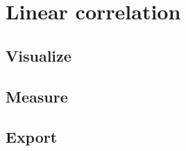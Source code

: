 %
%
%
\section{Linear correlation}


	\subsection{Visualize}

	\subsection{Measure}

	\subsection{Export}